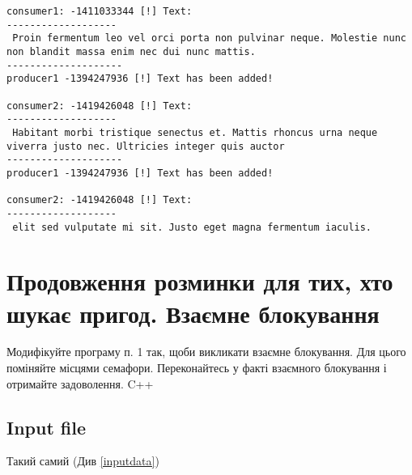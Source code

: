 \documentclass{article}
\begin{document}
\begin{verbatim}
consumer1: -1411033344 [!] Text: 
-------------------
 Proin fermentum leo vel orci porta non pulvinar neque. Molestie nunc non blandit massa enim nec dui nunc mattis. 
--------------------
producer1 -1394247936 [!] Text has been added! 

consumer2: -1419426048 [!] Text: 
-------------------
 Habitant morbi tristique senectus et. Mattis rhoncus urna neque viverra justo nec. Ultricies integer quis auctor
--------------------
producer1 -1394247936 [!] Text has been added! 

consumer2: -1419426048 [!] Text: 
-------------------
 elit sed vulputate mi sit. Justo eget magna fermentum iaculis.
\end{verbatim}

\newpage
\section{Продовження розминки для тих, хто шукає пригод. Взаємне блокування}
Модифікуйте програму п. 1 так, щоби викликати взаємне блокування.
Для цього поміняйте місцями семафори. Переконайтесь у факті взаємного
блокування і отримайте задоволення. C++

\subsection{Input file}

Такий самий (Див \ref{inputdata})
\end{document}
